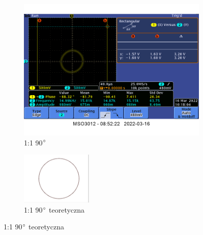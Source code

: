 \label{ad:teoretyczne_lissajous}
{
    \begin{figure}[H]
        \centering
        \begin{subfigure}[h]{0.45\textwidth}
            \includegraphics[scale=0.3]{images/1_5_1-1-90.png}
            \caption*{1:1 90$\degree$}
        \end{subfigure}
        \begin{subfigure}[h]{0.45\textwidth}
            \includegraphics[scale=1.9]{images/theoretical/1-1-90.png}
            \caption*{1:1 90$\degree$ teoretyczna}
        \end{subfigure}
    \end{figure}
    
}
